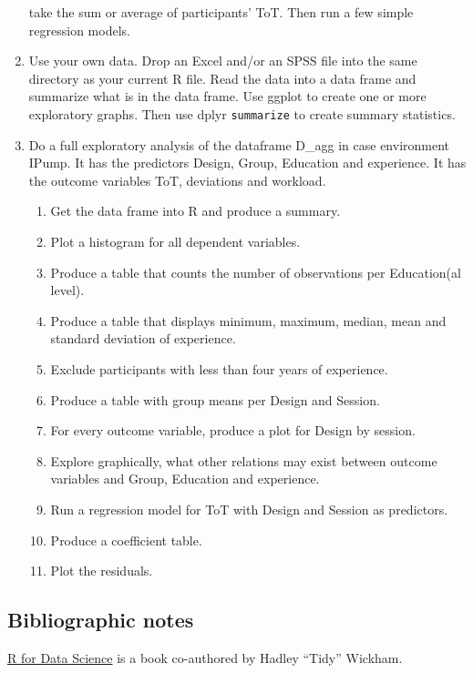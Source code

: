 \documentclass[]{svmono}
\providecommand{\tightlist}{%
  \setlength{\itemsep}{0pt}\setlength{\parskip}{0pt}}
\begin{document}
\begin{enumerate}
  take the sum or average of participants' ToT. Then run a few simple
  regression models.
\item
  Use your own data. Drop an Excel and/or an SPSS file into the same
  directory as your current R file. Read the data into a data frame and
  summarize what is in the data frame. Use ggplot to create one or more
  exploratory graphs. Then use dplyr \texttt{summarize} to create
  summary statistics.
\item
  Do a full exploratory analysis of the dataframe D\_agg in case
  environment IPump. It has the predictors Design, Group, Education and
  experience. It has the outcome variables ToT, deviations and workload.

  \begin{enumerate}
  \def\labelenumii{\arabic{enumii}.}
  \tightlist
  \item
    Get the data frame into R and produce a summary.
  \item
    Plot a histogram for all dependent variables.
  \item
    Produce a table that counts the number of observations per
    Education(al level).
  \item
    Produce a table that displays minimum, maximum, median, mean and
    standard deviation of experience.
  \item
    Exclude participants with less than four years of experience.
  \item
    Produce a table with group means per Design and Session.
  \item
    For every outcome variable, produce a plot for Design by session.
  \item
    Explore graphically, what other relations may exist between outcome
    variables and Group, Education and experience.
  \item
    Run a regression model for ToT with Design and Session as
    predictors.
  \item
    Produce a coefficient table.
  \item
    Plot the residuals.
  \end{enumerate}
\end{enumerate}

\subsection{Bibliographic notes}\label{bibliographic-notes-1}

\href{http://r4ds.had.co.nz/}{R for Data Science} is a book co-authored
by Hadley ``Tidy'' Wickham.
\end{document}

